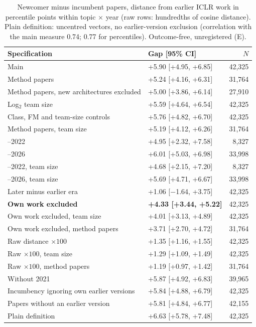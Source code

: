 \begin{table}[t]
\centering\footnotesize
\setlength{\tabcolsep}{3pt}
\begin{tabular}{@{}>{\raggedright\arraybackslash}p{3.3cm}lr@{}}
\toprule
Specification & Gap [95\% CI] & $N$ \\
\midrule
Main & +5.90 [+4.95, +6.85] & 42,325 \\
Method papers & +5.24 [+4.16, +6.31] & 31,764 \\
Method papers, new architectures excluded & +5.00 [+3.86, +6.14] & 27,910 \\
Log$_2$ team size & +5.59 [+4.64, +6.54] & 42,325 \\
Class, FM and team-size controls & +5.76 [+4.82, +6.70] & 42,325 \\
Method papers, team size & +5.19 [+4.12, +6.26] & 31,764 \\
\midrule
2019--2022 & +4.95 [+2.32, +7.58] & 8,327 \\
2023--2026 & +6.01 [+5.03, +6.98] & 33,998 \\
2019--2022, team size & +4.68 [+2.15, +7.20] & 8,327 \\
2023--2026, team size & +5.69 [+4.71, +6.67] & 33,998 \\
Later minus earlier era & +1.06 [$-$1.64, +3.75] & 42,325 \\
\midrule
\textbf{Own work excluded} & \textbf{+4.33 [+3.44, +5.22]} & 42,325 \\
Own work excluded, team size & +4.01 [+3.13, +4.89] & 42,325 \\
Own work excluded, method papers & +3.71 [+2.70, +4.72] & 31,764 \\
\midrule
Raw distance $\times 100$ & +1.35 [+1.16, +1.55] & 42,325 \\
Raw $\times 100$, team size & +1.29 [+1.09, +1.49] & 42,325 \\
Raw $\times 100$, method papers & +1.19 [+0.97, +1.42] & 31,764 \\
\midrule
Without 2021 & +5.87 [+4.92, +6.83] & 39,965 \\
Incumbency ignoring own earlier versions & +5.84 [+4.88, +6.79] & 42,325 \\
Papers without an earlier version & +5.81 [+4.84, +6.77] & 42,155 \\
Plain definition & +6.63 [+5.78, +7.48] & 42,325 \\
\bottomrule
\end{tabular}
\caption{Newcomer minus incumbent papers, distance from earlier ICLR work in percentile points within topic $\times$
year (raw rows: hundredths of cosine distance). Plain definition: uncentred vectors, no earlier-version exclusion
(correlation with the main measure 0.74; 0.77 for percentiles). Outcome-free, unregistered (E).}
\label{tab:app-dist}
\end{table}


